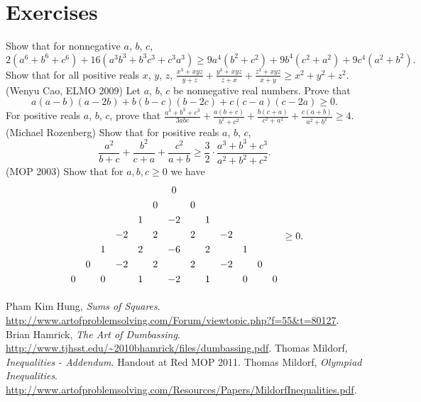 \documentclass{scrartcl}
\begin{document}
\section{Exercises}
\begin{enumerate}
  \ii Show that for nonnegative $a$, $b$, $c$,
    \[ 2(a^6+b^6+c^6) + 16(a^3b^3+b^3c^3+c^3a^3) \ge 9a^4(b^2+c^2) + 9b^4(c^2+a^2) + 9c^4(a^2+b^2). \]
  \ii Show that for all positive reals $x$, $y$, $z$,
    $\frac{x^3+xyz}{y+z} + \frac{y^3+xyz}{z+x} + \frac{z^3+xyz}{x+y} \ge x^2+y^2+z^2$.
  \ii (Wenyu Cao, ELMO 2009) Let $a$, $b$, $c$ be nonnegative real numbers.
    Prove that \[ a(a-b)(a-2b)+b(b-c)(b-2c)+c(c-a)(c-2a)\geq 0. \]
  \ii For positive reals $a$, $b$, $c$, prove that
    $\frac{a^{3}+b^{3}+c^{3}}{3abc}+\frac{a(b+c)}{b^{2}+c^{2}}
    +\frac{b(c+a)}{c^{2}+a^{2}}+\frac{c(a+b)}{a^{2}+b^{2}}\geq 4$.
  \ii (Michael Rozenberg) Show that for positive reals $a$, $b$, $c$,
    \[ \frac{a^2}{b+c} + \frac{b^2}{c+a} + \frac{c^2}{a+b} \ge \frac{3}{2} \cdot \frac{a^3+b^3+c^3}{a^2+b^2+c^2}. \]
  \ii (MOP 2003) Show that for $a,b,c \ge 0$ we have
  \[ \begin{array}{rccccccccccccc}& & & & & & 0\\\noalign{\smallskip}
    & & & & & 0 & & 0\\\noalign{\smallskip}
    & & & & 1 & &-2 & & 1\\\noalign{\smallskip}
    & & &-2 & & 2 & & 2 & &-2\\\noalign{\smallskip}
    & & 1 & & 2 & &-6 & & 2 & & 1\\\noalign{\smallskip}
    & 0 & &-2 & & 2 & & 2 & &-2 & & 0\\\noalign{\smallskip}
    0 & & 0 & & 1 & &-2 & & 1 & & 0 & & 0\\\noalign{\smallskip}
    \end{array} \ge 0. \]
\end{enumerate}

\begin{thebibliography}{99}
   Pham Kim Hung, \textit{Sums of Squares}.
    \url{http://www.artofproblemsolving.com/Forum/viewtopic.php?f=55&t=80127}.
   Brian Hamrick, \textit{The Art of Dumbassing}.
    \url{http://www.tjhsst.edu/~2010bhamrick/files/dumbassing.pdf}.
   Thomas Mildorf, \textit{Inequalities - Addendum}.
    Handout at Red MOP 2011.
   Thomas Mildorf, \textit{Olympiad Inequalities}.
    \url{http://www.artofproblemsolving.com/Resources/Papers/MildorfInequalities.pdf}.
\end{thebibliography}
\end{document}

